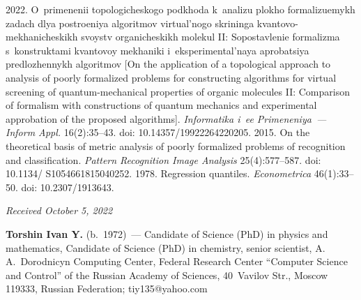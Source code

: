 \begin{multicols}{2}
{{\begin{thebibliography}{9}
 2022. O~primenenii topologicheskogo podkhoda k~analizu plokho 
formalizuemykh zadach dlya po\-stro\-e\-niya algoritmov virtual'nogo skrininga  
kvantovo-mekhanicheskikh svoystv organicheskikh molekul II: So\-po\-stav\-le\-nie formalizma 
s~konstruktami kvan\-to\-voy me\-kha\-ni\-ki i~eksperimental'naya aprobatsiya predlozhennykh algorit\-mov 
[On the application of a topological approach to analysis of poorly formalized problems for 
constructing algorithms for virtual screening of quantum-mechanical properties of organic 
molecules II: Comparison of formalism with constructions of quantum mechanics and experimental 
approbation of the proposed algorithms]. \textit{Informatika i~ee Primeneniya~--- Inform Appl.} 
16(2):35--43. doi: 10.14357/19922264220205. 
 2015. On the theoretical basis of metric analysis of 
poorly formalized problems of recognition and classification. \textit{Pattern Recognition Image Analysis} 
25(4):577--587. doi: 10.1134/ S1054661815040252.
 1978. Regression quantiles. \textit{Econometrica}  
46(1):33--50. doi: 10.2307/1913643.

\end{thebibliography}

 }
 }

\end{multicols}

\vspace*{-6pt}

\hfill{\small\textit{Received October 5, 2022}} 

\Contrl

\noindent
  \textbf{Torshin Ivan Y.} (b.\ 1972)~--- Candidate of Science (PhD) in physics and mathematics, 
Candidate of Science (PhD) in chemistry, senior scientist, A.\,A.~Dorodnicyn Computing Center, 
Federal Research Center ``Computer Science and Control'' of the Russian Academy of Sciences, 
40~Vavilov Str., Moscow 119333, Russian Federation; \mbox{tiy135@yahoo.com}
  

   
\label{end\stat}

\renewcommand{\bibname}{\protect\rm Литература} 
